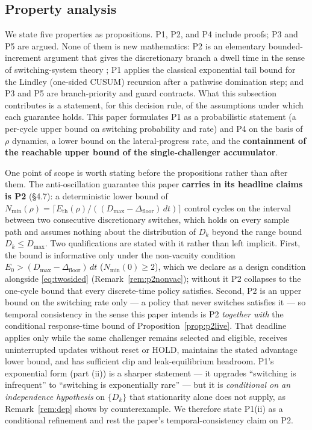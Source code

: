 \documentclass[11pt]{article}
\newcommand{\Dfloor}{\Delta_{\text{floor}}}
\newcommand{\Eth}{E_{\text{th}}}
\begin{document}
\FloatBarrier
\subsection{Property analysis}

We state five properties as propositions. P1, P2, and P4 include proofs; P3 and P5 are argued. None of them is new mathematics: P2 is an elementary bounded-increment argument that gives the discretionary branch a dwell time in the sense of switching-system theory \cite{hespanha1999dwell}; P1 applies the classical exponential tail bound for the Lindley (one-sided CUSUM) recursion \cite{lindley1952queue, kingman1970queues, page1954cusum} after a pathwise domination step; and P3 and P5 are branch-priority and guard contracts. What this subsection contributes is a statement, for this decision rule, of the assumptions under which each guarantee holds. This paper formulates P1 as a probabilistic statement (a per-cycle upper bound on switching probability and rate) and P4 on the basis of $\rho$ dynamics, a lower bound on the lateral-progress rate, and the \textbf{containment of the reachable upper bound of the single-challenger accumulator}.

One point of scope is worth stating before the propositions rather than after them. The anti-oscillation guarantee this paper \textbf{carries in its headline claims is P2} (\S4.7): a deterministic lower bound of $N_{\min}(\rho) = \lceil \Eth(\rho)/((D_{\max}-\Dfloor)\,dt)\rceil$ control cycles on the interval between two consecutive discretionary switches, which holds on every sample path and assumes nothing about the distribution of $D_k$ beyond the range bound $D_k \le D_{\max}$. Two qualifications are stated with it rather than left implicit. First, the bound is informative only under the non-vacuity condition $E_0 > (D_{\max}-\Dfloor)\,dt$ ($N_{\min}(0) \ge 2$), which we declare as a design condition alongside \eqref{eq:twosided} (Remark~\ref{rem:p2nonvac}); without it P2 collapses to the one-cycle bound that every discrete-time policy satisfies. Second, P2 is an upper bound on the switching rate only --- a policy that never switches satisfies it --- so temporal consistency in the sense this paper intends is P2 \emph{together with} the conditional response-time bound of Proposition~\ref{prop:p2live}. That deadline applies only while the same challenger remains selected and eligible, receives uninterrupted updates without reset or HOLD, maintains the stated advantage lower bound, and has sufficient clip and leak-equilibrium headroom. P1's exponential form (part (ii)) is a sharper statement --- it upgrades ``switching is infrequent'' to ``switching is exponentially rare'' --- but it is \emph{conditional on an independence hypothesis} on $\{D_k\}$ that stationarity alone does not supply, as Remark~\ref{rem:dep} shows by counterexample. We therefore state P1(ii) as a conditional refinement and rest the paper's temporal-consistency claim on P2.
\end{document}
